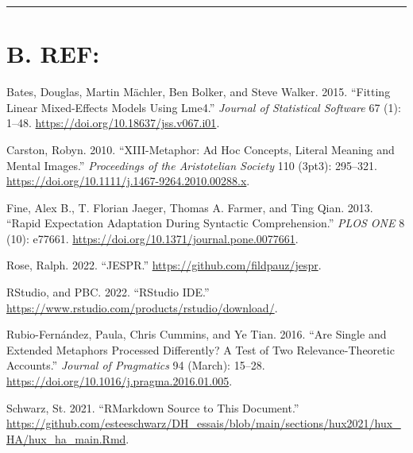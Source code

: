 \documentclass[
]{article}
\newlength{\cslhangindent}
\newlength{\cslentryspacingunit} %
\newenvironment{CSLReferences}[2] %
 {%
  \setlength{\parindent}{0pt}
  \ifodd #1
  \let\oldpar\par
  \def\par{\hangindent=\cslhangindent\oldpar}
  \fi
  \setlength{\parskip}{#2\cslentryspacingunit}
 }%
 {}
\begin{document}
\begin{center}\rule{0.5\linewidth}{0.5pt}\end{center}

\hypertarget{b.-ref}{%
\section*{B. REF:}\label{b.-ref}}

\hypertarget{refs}{}
\begin{CSLReferences}{1}{0}
\leavevmode{}%
Bates, Douglas, Martin Mächler, Ben Bolker, and Steve Walker. 2015. {``Fitting {Linear} {Mixed}-{Effects} {Models} {Using} Lme4.''} \emph{Journal of Statistical Software} 67 (1): 1--48. \url{https://doi.org/10.18637/jss.v067.i01}.

\leavevmode{}%
Carston, Robyn. 2010. {``{XIII}-{Metaphor}: {Ad} {Hoc} {Concepts}, {Literal} {Meaning} and {Mental} {Images}.''} \emph{Proceedings of the Aristotelian Society} 110 (3pt3): 295--321. \url{https://doi.org/10.1111/j.1467-9264.2010.00288.x}.

\leavevmode{}%
Fine, Alex B., T. Florian Jaeger, Thomas A. Farmer, and Ting Qian. 2013. {``Rapid {Expectation} {Adaptation} During {Syntactic} {Comprehension}.''} \emph{PLOS ONE} 8 (10): e77661. \url{https://doi.org/10.1371/journal.pone.0077661}.

\leavevmode{}%
Rose, Ralph. 2022. {``{JESPR}.''} \url{https://github.com/fildpauz/jespr}.

\leavevmode{}%
RStudio, and PBC. 2022. {``{RStudio} {IDE}.''} \url{https://www.rstudio.com/products/rstudio/download/}.

\leavevmode{}%
Rubio-Fernández, Paula, Chris Cummins, and Ye Tian. 2016. {``Are Single and Extended Metaphors Processed Differently? {A} Test of Two {Relevance}-{Theoretic} Accounts.''} \emph{Journal of Pragmatics} 94 (March): 15--28. \url{https://doi.org/10.1016/j.pragma.2016.01.005}.

\leavevmode{}%
Schwarz, St. 2021. {``{RMarkdown} Source to This Document.''} \url{https://github.com/esteeschwarz/DH_essais/blob/main/sections/hux2021/hux_HA/hux_ha_main.Rmd}.

\end{CSLReferences}
\end{document}
